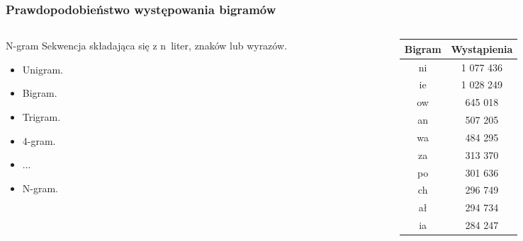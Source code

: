 \documentclass[10pt,a4paper]{beamer}
\begin{document}
\begin{frame}
	\frametitle{Prawdopodobieństwo występowania bigramów}
	
	\begin{columns}
		\begin{column}{.5\textwidth}
			\begin{block}{N-gram}
				Sekwencja składająca się z n~liter, znaków lub wyrazów.
			\end{block}
			
		\begin{itemize}
			\item Unigram.
			\item Bigram.
			\item Trigram.
			\item 4-gram.
			\item ...
			\item N-gram.
		\end{itemize}
		
		\end{column}
		
		\begin{column}{.5\textwidth}
			\begin{tabular}{|c|c|}
				\hline
				Bigram	&	Wystąpienia	\\
				\hline
				ni		&	1 077 436	\\
				ie		&	1 028 249	\\
				ow	&	645 018		\\
				an		&	507 205		\\
				wa	&	484 295		\\
				za		&	313 370		\\
				po		&	301 636		\\
				ch		&	296 749		\\
				ał		&	294 734		\\
				ia		&	284 247		\\
				\hline
			\end{tabular}

		\end{column}

	\end{columns}

\end{frame}
\end{document}
